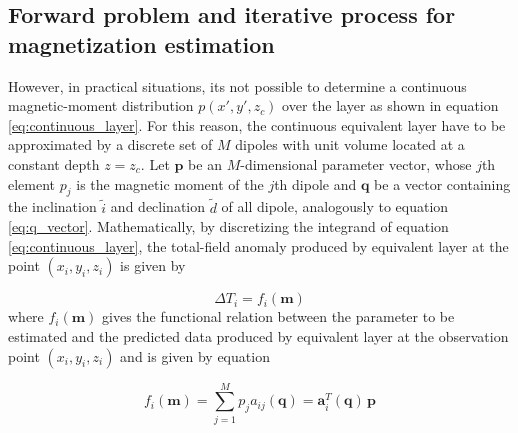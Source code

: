 \subsection{Forward problem and iterative process for magnetization estimation}

However, in practical situations, its not possible to determine a continuous magnetic-moment distribution $p(x',y',z_c)$ over the layer as shown in equation \ref{eq:continuous_layer}. For this reason, the continuous equivalent layer have to be approximated  by a discrete set of $M$ dipoles with unit volume located at a constant depth $z = z_c$. Let $\mathbf{p}$ be an $M$-dimensional parameter vector, whose $j$th element $p_j$ is the magnetic moment of the $j$th dipole and $\mathbf{q}$ be a vector containing the inclination $\tilde{i}$ and declination $\tilde{d}$ of all dipole, analogously to equation \ref{eq:q_vector}. Mathematically, by discretizing the integrand of equation \ref{eq:continuous_layer}, the total-field anomaly produced by equivalent layer at the point $(x_i,y_i,z_i)$ is given by 

\begin{equation}
\Delta T_i = f_i (\mathbf{m})
\label{eq:tfa_pred_pos_i}
\end{equation}    
where $f_i (\mathbf{m})$ gives the functional relation between the parameter to be estimated and the predicted data produced by equivalent layer at the observation point $(x_i,y_i,z_i)$ and is given by equation

\begin{equation}
f_i (\mathbf{m}) = \sum_{j=1}^{M} p_j a_{ij} (\mathbf{q}) = \mathbf{a}_{i}^{T} (\mathbf{q}) \, \mathbf{p} 
\label{eq:f_i}
\end{equation}  







